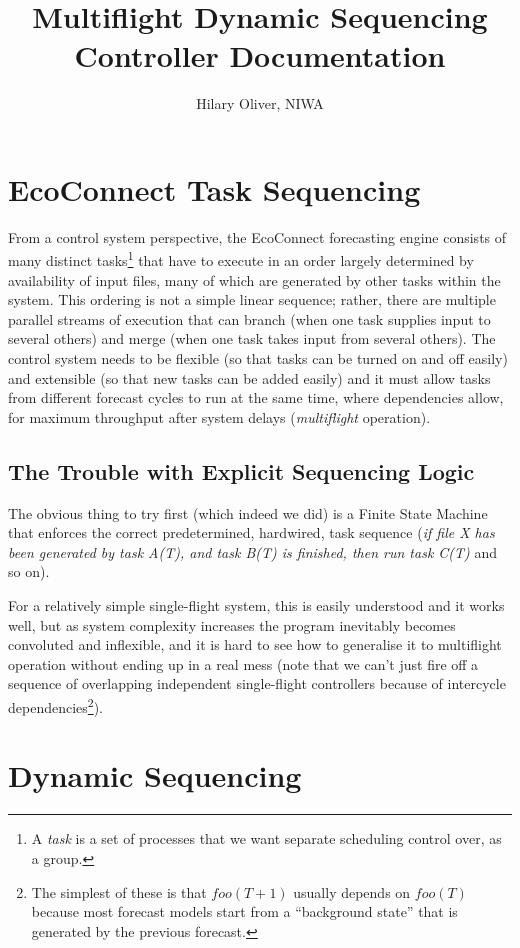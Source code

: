 \documentclass[a4paper,12pt]{amsart}
\title{Multiflight Dynamic Sequencing Controller Documentation}
\author{Hilary Oliver, NIWA}
\begin{document}
\maketitle

\section{EcoConnect Task Sequencing} 

From a control system perspective, the EcoConnect forecasting engine
consists of many distinct tasks\footnote{A {\em task} is a set of
processes that we want separate scheduling control over, as a group.}
that have to execute in an order largely determined by availability of
input files, many of which are generated by other tasks within the
system. This ordering is not a simple linear sequence; rather, there are
multiple parallel streams of execution that can branch (when one task
supplies input to several others) and merge (when one task takes input
from several others). The control system needs to be flexible (so that
tasks can be turned on and off easily) and extensible (so that new tasks
can be added easily) and it must allow tasks from different forecast
cycles to run at the same time, where dependencies allow, for maximum
throughput after system delays ({\em multiflight} operation). 


\subsection{The Trouble with Explicit Sequencing Logic}

The obvious thing to try first (which indeed we did) is a Finite State
Machine that enforces the correct predetermined, hardwired, task
sequence ({\em if file X has been generated by task A(T), and task B(T)
is finished, then run task C(T)} and so on). 

For a relatively simple single-flight system, this is easily understood
and it works well, but as system complexity increases the program
inevitably becomes convoluted and inflexible, and it is hard to see how
to generalise it to multiflight operation without ending up in a real
mess (note that we can't just fire off a sequence of overlapping
independent single-flight controllers because of intercycle
dependencies\footnote{The simplest of these is that $foo(T+1)$ usually
depends on $foo(T)$ because most forecast models start from a
``background state'' that is generated by the previous forecast.}). 


\section{Dynamic Sequencing}
\end{document}

